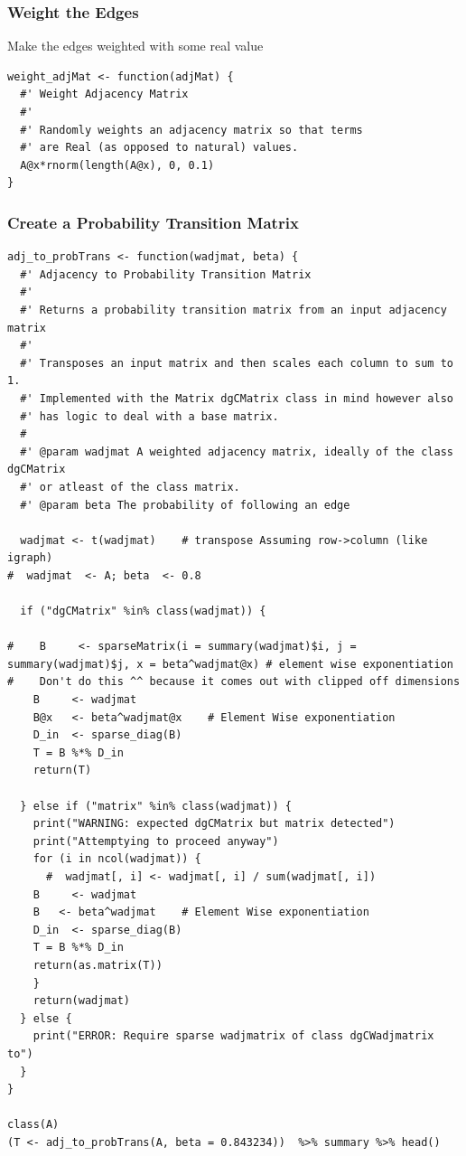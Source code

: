 \documentclass[11pt]{article}
\begin{document}
\subsubsection{Weight the Edges}
\label{sec:orgd9e1c9e}
Make the edges weighted with some real value

\lstset{language=r,label= ,caption= ,captionpos=b,numbers=none}
\begin{lstlisting}
weight_adjMat <- function(adjMat) {
  #' Weight Adjacency Matrix
  #'
  #' Randomly weights an adjacency matrix so that terms
  #' are Real (as opposed to natural) values.
  A@x*rnorm(length(A@x), 0, 0.1)
}
\end{lstlisting}

\subsubsection{Create a Probability Transition Matrix}
\label{sec:org7be8b81}
\lstset{language=r,label= ,caption= ,captionpos=b,numbers=none}
\begin{lstlisting}
adj_to_probTrans <- function(wadjmat, beta) {
  #' Adjacency to Probability Transition Matrix
  #'
  #' Returns a probability transition matrix from an input adjacency matrix
  #'
  #' Transposes an input matrix and then scales each column to sum to 1.
  #' Implemented with the Matrix dgCMatrix class in mind however also
  #' has logic to deal with a base matrix.
  #
  #' @param wadjmat A weighted adjacency matrix, ideally of the class dgCMatrix
  #' or atleast of the class matrix.
  #' @param beta The probability of following an edge

  wadjmat <- t(wadjmat)    # transpose Assuming row->column (like igraph)
#  wadjmat  <- A; beta  <- 0.8

  if ("dgCMatrix" %in% class(wadjmat)) {

#    B     <- sparseMatrix(i = summary(wadjmat)$i, j = summary(wadjmat)$j, x = beta^wadjmat@x) # element wise exponentiation
#    Don't do this ^^ because it comes out with clipped off dimensions
    B     <- wadjmat
    B@x   <- beta^wadjmat@x    # Element Wise exponentiation
    D_in  <- sparse_diag(B)
    T = B %*% D_in
    return(T)

  } else if ("matrix" %in% class(wadjmat)) {
    print("WARNING: expected dgCMatrix but matrix detected")
    print("Attemptying to proceed anyway")
    for (i in ncol(wadjmat)) {
      #  wadjmat[, i] <- wadjmat[, i] / sum(wadjmat[, i])
    B     <- wadjmat
    B   <- beta^wadjmat    # Element Wise exponentiation
    D_in  <- sparse_diag(B)
    T = B %*% D_in
    return(as.matrix(T))
    }
    return(wadjmat)
  } else {
    print("ERROR: Require sparse wadjmatrix of class dgCWadjmatrix to")
  }
}

class(A)
(T <- adj_to_probTrans(A, beta = 0.843234))  %>% summary %>% head()
\end{lstlisting}
\end{document}
